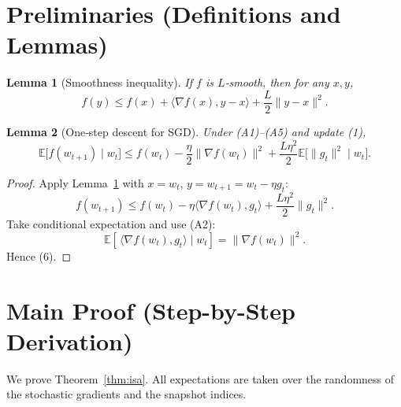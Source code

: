 \documentclass{article}
\newtheorem{lemma}{Lemma}
\begin{document}
\section*{Preliminaries (Definitions and Lemmas)}
\begin{lemma}[Smoothness inequality]\label{lem:smooth}
If $f$ is $L$‑smooth, then for any $x,y$,
\[
f(y)\le f(x)+\langle\nabla f(x),y-x\rangle+\frac{L}{2}\|y-x\|^{2}.
\tag{5}
\]
\end{lemma}
\begin{lemma}[One‑step descent for SGD]\label{lem:descent}
Under (A1)–(A5) and update (1),
\[
\mathbb{E}\big[f(w_{t+1})\mid w_t\big]\le
f(w_t)-\frac{\eta}{2}\|\nabla f(w_t)\|^{2}
+\frac{L\eta^{2}}{2}\mathbb{E}\big[\|g_t\|^{2}\mid w_t\big].
\tag{6}
\]
\end{lemma}
\begin{proof}
Apply Lemma~\ref{lem:smooth} with $x=w_t$, $y=w_{t+1}=w_t-\eta g_t$:
\[
f(w_{t+1})\le f(w_t)-\eta\langle\nabla f(w_t),g_t\rangle
+\frac{L\eta^{2}}{2}\|g_t\|^{2}.
\]
Take conditional expectation and use (A2):
\[
\mathbb{E}[\,\langle\nabla f(w_t),g_t\rangle\mid w_t]
= \|\nabla f(w_t)\|^{2}.
\]
Hence (6). \qedhere
\end{proof}

\section*{Main Proof (Step-by-Step Derivation)}
We prove Theorem~\ref{thm:isa}.  All expectations are taken over the
randomness of the stochastic gradients and the snapshot indices.
\end{document}

